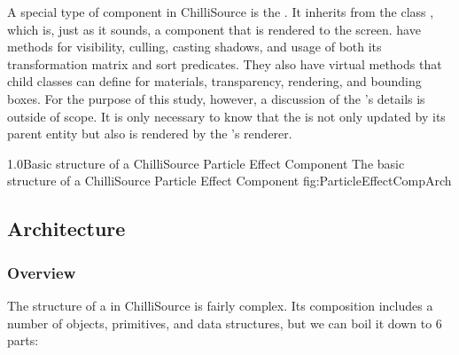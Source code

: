 A special type of component in ChilliSource is the . It inherits from the  class \footnotemark, which is, just as it sounds, a component that is rendered to the screen.  have methods for visibility, culling, casting shadows, and usage of both its transformation matrix and sort predicates. They also have virtual methods that child classes can define for materials, transparency, rendering, and bounding boxes. For the purpose of this study, however, a discussion of the 's details is outside of scope. It is only necessary to know that the  is not only updated by its parent entity but also is rendered by the 's renderer.


{1.0}{Basic structure of a ChilliSource Particle Effect Component}
{The basic structure of a ChilliSource Particle Effect Component}
{fig:ParticleEffectCompArch}

\begin{samepage}

\subsection{Architecture}\label{ssec:cs_pec_arch}

\subsubsection{Overview}

\end{samepage}

The structure of a  in ChilliSource is fairly complex. Its composition includes a number of objects, primitives, and data structures, but we can boil it down to 6 parts:

